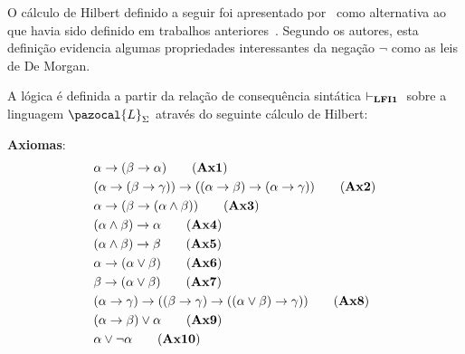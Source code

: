     O cálculo de Hilbert definido a seguir foi apresentado por~ como alternativa ao que havia sido definido em trabalhos anteriores~\cite{carnielli2000formal,carnielli2007}. Segundo os autores, esta definição evidencia algumas propriedades interessantes da negação $\neg$ como as leis de De Morgan.


    \begin{definicao}\label{def:hilbert_lfi1}
        A lógica \lfium{} é definida a partir da relação de consequência sintática $\vdash_{{\normalfont\textbf{LFI1}}{}}{}$ sobre a linguagem $\pazocal{L}_{\Sigma}$ através do seguinte cálculo de Hilbert:

        \noindent\textbf{Axiomas}:
        \begin{align*}
            & \alpha \to (\beta \to \alpha)                                                     \tag{\textbf{Ax1}}            \label{ax:ax1}\\
            & (\alpha \to (\beta \to \gamma)) \to ((\alpha \to \beta) \to (\alpha \to \gamma )) \tag{\textbf{Ax2}}            \label{ax:ax2}\\
            & \alpha \to (\beta \to (\alpha \land \beta))                                       \tag{\textbf{Ax3}}            \label{ax:ax3}\\
            & (\alpha \land \beta) \to \alpha                                                   \tag{\textbf{Ax4}}            \label{ax:ax4}\\
            & (\alpha \land \beta) \to \beta                                                    \tag{\textbf{Ax5}}            \label{ax:ax5}\\
            & \alpha \to (\alpha \lor \beta)                                                    \tag{\textbf{Ax6}}            \label{ax:ax6}\\
            & \beta \to (\alpha \lor \beta)                                                     \tag{\textbf{Ax7}}            \label{ax:ax7}\\
            & (\alpha \to \gamma) \to ((\beta \to \gamma) \to ((\alpha \lor \beta) \to \gamma)) \tag{\textbf{Ax8}}            \label{ax:ax8}\\
            & (\alpha \to \beta) \lor \alpha                                                    \tag{\textbf{Ax9}}            \label{ax:ax9}\\
            & \alpha \lor \neg \alpha                                                           \tag{\textbf{Ax10}}           \label{ax:ax10}\\

\end{align*}
\end{definicao}
